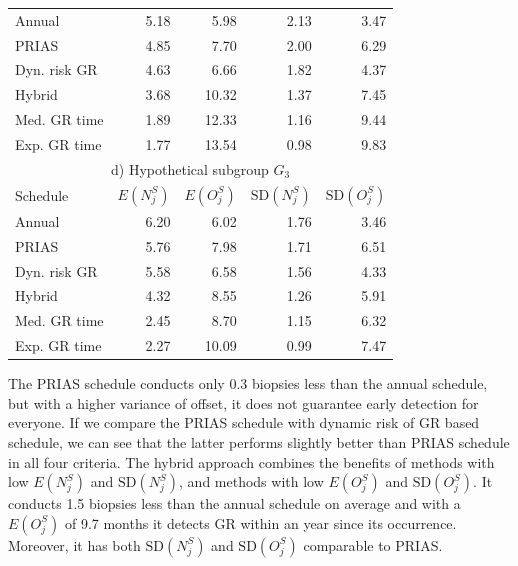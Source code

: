 \begin{table}
\begin{tabular}{lrrrr}
\hline
Annual         & 5.18            & 5.98                & 2.13          & 3.47              \\
PRIAS          & 4.85            & 7.70                & 2.00          & 6.29        \\
Dyn. risk GR       & 4.63            & 6.66                & 1.82          & 4.37              \\
Hybrid       & 3.68            & 10.32                & 1.37          & 7.45              \\
Med. GR time & 1.89             & 12.33               & 1.16          & 9.44              \\
Exp. GR time & 1.77            & 13.54               & 0.98          & 9.83              \\
\hline      
\multicolumn{5}{c}{d) Hypothetical subgroup $G_3$}\\
\hline
Schedule        & $E(N^S_j)$ & $E(O^S_j)$ & ${\mbox{SD}(N^S_j)}$ & ${\mbox{SD}(O^S_j)}$ \\
\hline
Annual         & 6.20             & 6.02                & 1.76          & 3.46              \\
PRIAS          & 5.76             & 7.98                & 1.71         & 6.51        \\
Dyn. risk GR       & 5.58            & 6.58                & 1.56          & 4.33              \\
Hybrid       & 4.32            & 8.55                & 1.26          & 5.91              \\
Med. GR time & 2.45            & 8.70                & 1.15          & 6.32              \\
Exp. GR time & 2.27            & 10.09               & 0.99          & 7.47              \\
\hline     
\end{tabular}
\end{table}

The PRIAS schedule conducts only 0.3 biopsies less than the annual schedule, but with a higher variance of offset, it does not guarantee early detection for everyone. If we compare the PRIAS schedule with dynamic risk of GR based schedule, we can see that the latter performs slightly better than PRIAS schedule in all four criteria. The hybrid approach combines the benefits of methods with low $E(N^S_j)$ and $\mbox{SD}(N^S_j)$, and methods with low $E(O^S_j)$ and $\mbox{SD}(O^S_j)$. It conducts 1.5 biopsies less than the annual schedule on average and with a $E(O^S_j)$ of 9.7 months it detects GR within an year since its occurrence. Moreover, it has both $\mbox{SD}(N^S_j)$ and $\mbox{SD}(O^S_j)$ comparable to PRIAS.

